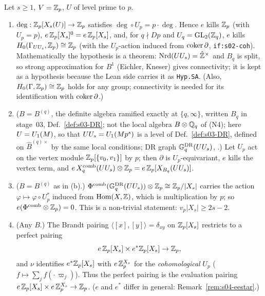 \begin{lemma}\label{lem:s04-ekills}
Let $s\ge1$, $V=\mathbb{Z}_p$, $U$ of level prime to $p$.
\begin{enumerate}[label=(\alph*)]
\item $\deg:\mathbb{Z}_p[X_s(U)]\to\mathbb{Z}_p$ satisfies $\deg\circ U_p=p\cdot\deg$. Hence $e$ kills $\mathbb{Z}_p$ (with $U_p=p$), $e\,\mathbb{Z}_p[X_s]^0=e\,\mathbb{Z}_p[X_s]$,
  and, for $q\nmid Dp$ and $U_q=\mathrm{GL}_2(\mathbb{Z}_q)$, $e$ kills $H_0(\Gamma_{UU_s},\mathbb{Z}_p)\cong\mathbb{Z}_p$ (with the $U_p$-action induced from
  $\operatorname{coker}\partial$, \texttt{if:s02-coh}).
   Mathematically the hypothesis is a theorem:
  $\mathrm{Nrd}(UU_s)=\hat{\mathbb{Z}}^\times$ and $B_q$ is split, so strong approximation for $B^1$ (Eichler, Kneser) gives connectivity; it is kept as
  a hypothesis because the Lean side carries it as \texttt{Hyp.SA}. (Also, $H_0(\Gamma,\mathbb{Z}_p)\cong\mathbb{Z}_p$ holds for any group; connectivity
  is needed for its identification with $\operatorname{coker}\partial$.)
\item ($B=B^{(q)}$, the definite algebra ramified exactly at $\{q,\infty\}$, written $B_q$ in stage~03, Def.~\ref{def:s03-DR}; not
  the local algebra $B\otimes\mathbb{Q}_q$ of (N4); here $U=U_1(M)$, so that $UU_s=U_1(Mp^s)$ is a level of Def.~\ref{def:s03-DR}, defined on
  $\hat B^{(q)\times}$ by the same local conditions; DR graph $\mathbb{G}^{\mathrm{DR}}_q(UU_s)$, .) Let $U_p$ act on the vertex module $\mathbb{Z}_p[\{v_0,v_1\}]$ by $p$; then
  $\partial$ is $U_p$-equivariant, $e$ kills the vertex term, and $e\,X^{\mathrm{comb}}_q(UU_s)\otimes\mathbb{Z}_p=e\,\mathbb{Z}_p[X_{B_q}(UU_s)]$.
\item ($B=B^{(q)}$ as in (b).) $\Phi^{\mathrm{comb}}(\mathbb{G}^{\mathrm{DR}}_q(UU_s))\otimes\mathbb{Z}_p\cong\mathbb{Z}_p/|X_s|$ carries the action $\varphi\mapsto\varphi\circ U_p^*$ induced from
  $\operatorname{Hom}(X,\mathbb{Z})$, which is multiplication by $p$; so $e(\Phi^{\mathrm{comb}}\otimes\mathbb{Z}_p)=0$. This is a non-trivial statement: $v_p|X_s|\ge 2s-2$.
\item (Any $B$.) The Brandt pairing $\langle[x],[y]\rangle=\delta_{xy}$ on $\mathbb{Z}_p[X_s]$ restricts to a perfect pairing
  \[e\,\mathbb{Z}_p[X_s]\times e^*\mathbb{Z}_p[X_s]\to\mathbb{Z}_p,\]
  and $\nu$ identifies $e^*\mathbb{Z}_p[X_s]$ with $e\,\mathbb{Z}_p^{X_s}$ for the \emph{cohomological} $U_p$ ($f\mapsto\sum_jf(\cdot\,\varpi_j)$).
  Thus the perfect pairing is the evaluation pairing $e\,\mathbb{Z}_p[X_s]\times e\,\mathbb{Z}_p^{X_s}\to\mathbb{Z}_p$. ($e$ and $e^*$ differ in general:
  Remark~\ref{rem:s04-eestar}.)
\end{enumerate}

\end{lemma}
